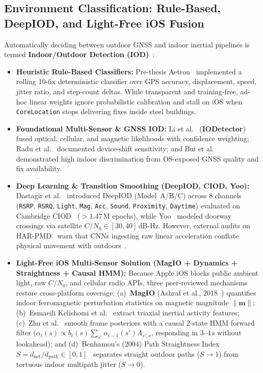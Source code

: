 \subsection{Environment Classification: Rule-Based, DeepIOD, and Light-Free iOS Fusion}
Automatically deciding between outdoor GNSS and indoor inertial pipelines is termed \textbf{Indoor/Outdoor Detection (IOD)}~\cite{feriol2020review,angelats2024seamless}:
\begin{itemize}
    \item \textbf{Heuristic Rule-Based Classifiers:} Pre-thesis Aetron~\cite{aetron2026prethesis} implemented a rolling 10-fix deterministic classifier over GPS accuracy, displacement, speed, jitter ratio, and step-count deltas. While transparent and training-free, ad-hoc linear weights ignore probabilistic calibration and stall on iOS when \texttt{CoreLocation} stops delivering fixes inside steel buildings.
    \item \textbf{Foundational Multi-Sensor \& GNSS IOD:} Li et al.~\cite{li2014iodetector} (\textbf{IODetector}) fused optical, cellular, and magnetic likelihoods with confidence weighting; Radu et al.~\cite{radu2014semisupervised} documented device-shift sensitivity; and Bui et al.~\cite{bui2020gpsiod} demonstrated high indoor discrimination from OS-exposed GNSS quality and fix availability.
    \item \textbf{Deep Learning \& Transition Smoothing (DeepIOD, CIOD, Yoo):} Dastagir et al.~\cite{dastagir2024deepiod} introduced DeepIOD (Model~A/B/C) across 8 channels (\texttt{RSRP}, \texttt{RSRQ}, \texttt{Light}, \texttt{Mag}, \texttt{Acc}, \texttt{Sound}, \texttt{Proximity}, \texttt{Daytime}) evaluated on Cambridge CIOD~\cite{bakirtzis2022ciod} ($>1.47$\,M epochs), while Yoo~\cite{yoo2025seamless} modeled doorway crossings via satellite $C/N_0 \in [30, 40]$\,dB-Hz. However, external audits on HAR-PMD~\cite{harpmd2025dataset} warn that CNNs ingesting raw linear acceleration conflate physical movement with outdoors~\cite{wang2019deep}.
    \item \textbf{Light-Free iOS Multi-Sensor Solution (MagIO + Dynamics + Straightness + Causal HMM):} Because Apple iOS blocks public ambient light, raw $C/N_0$, and cellular radio APIs, three peer-reviewed mechanisms restore cross-platform coverage: (a)~\textbf{MagIO} (Ashraf et al., 2018~\cite{ashraf2018magio}) quantifies indoor ferromagnetic perturbation statistics on magnetic magnitude $\|\mathbf{m}\|$; (b)~Esmaeili Kelishomi et al.~\cite{kelishomi2019activities} extract triaxial inertial activity features; (c)~Zhu et al.~\cite{zhu2019fast} smooth frame posteriors with a causal 2-state HMM forward filter ($\alpha_t(s) \propto b_t(s)\sum_{s'} \alpha_{t-1}(s') A_{s',s}$, responding in $3$--$4$\,s without lookahead); and (d)~Benhamou's (2004) Path Straightness Index $S = d_{\text{net}}/d_{\text{path}} \in [0, 1]$~\cite{benhamou2004tortuosity} separates straight outdoor paths ($S \to 1$) from tortuous indoor multipath jitter ($S \to 0$).
\end{itemize}

